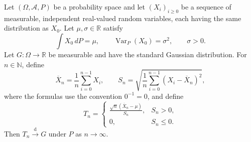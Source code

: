 \begin{theorem}
Let $(\Omega,\mathcal A,P)$ be a probability space and let
$(X_i)_{i\ge0}$ be a sequence of measurable, independent real-valued random
variables, each having the same distribution as $X_0$.  Let
$\mu,\sigma\in\mathbb R$ satisfy
\[
  \int X_0\,dP=\mu,\qquad
  \operatorname{Var}_P(X_0)=\sigma^2,\qquad
  \sigma>0.
\]
Let $G:\Omega\to\mathbb R$ be measurable and have the standard Gaussian
distribution.  For $n\in\mathbb N$, define
\[
 \overline X_n=\frac1n\sum_{i=0}^{n-1}X_i,
 \qquad
 S_n=\sqrt{\frac1n\sum_{i=0}^{n-1}(X_i-\overline X_n)^2},
\]
where the formulas use the convention $0^{-1}=0$, and define
\[
 T_n=
 \begin{cases}
 \displaystyle\frac{\sqrt n(\overline X_n-\mu)}{S_n},&S_n>0,\\[5pt]
 0,&S_n\le0.
 \end{cases}
\]
Then $T_n\xrightarrow{\mathrm d}G$ under $P$ as $n\to\infty$.
\end{theorem}
